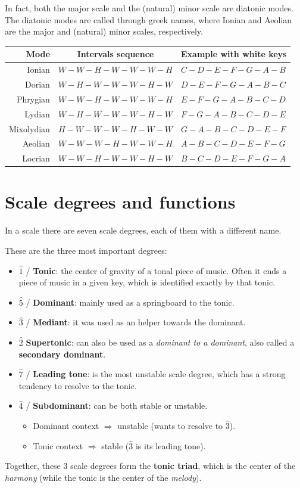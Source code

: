 In fact, both the major scale and the (natural) minor scale are diatonic modes. The diatonic modes are called through greek names, where {\color{OrangeRed}Ionian} and {\color{RoyalBlue}Aeolian} are the major and (natural) minor scales, respectively.

\begin{center}
    \begin{tabular}{r|c|l}
        \textbf{Mode} & \textbf{Intervals sequence} & \textbf{Example with white keys} \\
        \hline
        {\color{OrangeRed}Ionian} & $W-W-H-W-W-W-H$ & $C-D-E-F-G-A-B$ \\ 
        Dorian & $W-H-W-W-W-H-W$ & $D-E-F-G-A-B-C$ \\
        Phrygian & $W-W-H-W-W-W-H$ & $E-F-G-A-B-C-D$ \\
        Lydian & $W-H-W-W-W-H-W$ & $F-G-A-B-C-D-E$ \\
        Mixolydian & $H-W-W-W-H-W-W$ & $G-A-B-C-D-E-F$ \\
        {\color{RoyalBlue}Aeolian} & $W-W-W-H-W-W-H$ & $A-B-C-D-E-F-G$ \\
        Locrian & $W-W-H-W-W-H-W$ & $B-C-D-E-F-G-A$ \\
    \end{tabular}
\end{center}

\section{Scale degrees and functions}
In a scale there are seven scale degrees, each of them with a different name.

These are the three most important degrees:
\begin{itemize}
    \item $\hat 1$ / \textbf{Tonic}: the center of gravity of a tonal piece of music. Often it ends a piece of music in a given key, which is identified exactly by that tonic.
    \item $\hat 5$ / \textbf{Dominant}: mainly used as a springboard to the tonic.
    \item $\hat 3$  / \textbf{Mediant}: it was used as an helper towards the dominant.
    \item $\hat 2$ \textbf{Supertonic}: can also be used as a \emph{dominant to a dominant}, also called a \textbf{secondary dominant}.
    \item $\hat 7$ / \textbf{Leading tone}: is the most unstable scale degree, which has a strong tendency to resolve to the tonic.
    \item $\hat 4$ / \textbf{Subdominant}: can be both stable or unstable.
    \begin{itemize}
        \item Dominant context $\Rightarrow$ unstable (wants to resolve to $\hat 3$).
        \item Tonic context $\Rightarrow$ stable ($\hat 3$ is its leading tone).
    \end{itemize}
\end{itemize}
Together, these 3 scale degrees form the \textbf{tonic triad}, which is the center of the \emph{harmony} (while the tonic is the center of the \emph{melody}).

